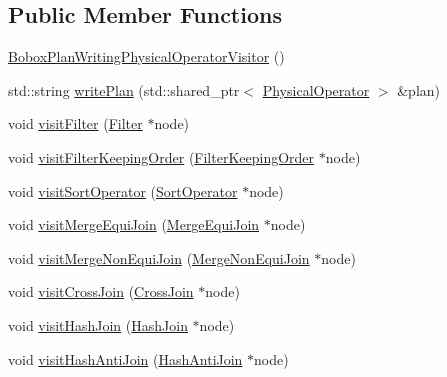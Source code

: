 \subsection*{Public Member Functions}
\begin{DoxyCompactItemize}
\item 
\hyperlink{class_bobox_plan_writing_physical_operator_visitor_a77c03666c41cd9a0db08dc5681fd1512}{Bobox\+Plan\+Writing\+Physical\+Operator\+Visitor} ()
\item 
std\+::string \hyperlink{class_bobox_plan_writing_physical_operator_visitor_ad19fe61538f80b821617614a31e30cb2}{write\+Plan} (std\+::shared\+\_\+ptr$<$ \hyperlink{class_physical_operator}{Physical\+Operator} $>$ \&plan)
\item 
void \hyperlink{class_bobox_plan_writing_physical_operator_visitor_a443e89add4155e51b2d7d1973afb3af5}{visit\+Filter} (\hyperlink{class_filter}{Filter} $\ast$node)
\item 
void \hyperlink{class_bobox_plan_writing_physical_operator_visitor_a041f79a1705915af0d45e623ad7a18ac}{visit\+Filter\+Keeping\+Order} (\hyperlink{class_filter_keeping_order}{Filter\+Keeping\+Order} $\ast$node)
\item 
void \hyperlink{class_bobox_plan_writing_physical_operator_visitor_ac482fb6eae4e0bcb957bad6c572a2c03}{visit\+Sort\+Operator} (\hyperlink{class_sort_operator}{Sort\+Operator} $\ast$node)
\item 
void \hyperlink{class_bobox_plan_writing_physical_operator_visitor_ac66108bf441456b57aded81ac17b111b}{visit\+Merge\+Equi\+Join} (\hyperlink{class_merge_equi_join}{Merge\+Equi\+Join} $\ast$node)
\item 
void \hyperlink{class_bobox_plan_writing_physical_operator_visitor_a75a1a20aecd434d712dff1867bf5ec37}{visit\+Merge\+Non\+Equi\+Join} (\hyperlink{class_merge_non_equi_join}{Merge\+Non\+Equi\+Join} $\ast$node)
\item 
void \hyperlink{class_bobox_plan_writing_physical_operator_visitor_a882ad63c59098b1bca68fca5d36b8871}{visit\+Cross\+Join} (\hyperlink{class_cross_join}{Cross\+Join} $\ast$node)
\item 
void \hyperlink{class_bobox_plan_writing_physical_operator_visitor_a5616d43abbe0666c854342af2d3aec94}{visit\+Hash\+Join} (\hyperlink{class_hash_join}{Hash\+Join} $\ast$node)
\item 
void \hyperlink{class_bobox_plan_writing_physical_operator_visitor_a01ed46af47fc5c7fb7af2b6b5b2483ba}{visit\+Hash\+Anti\+Join} (\hyperlink{class_hash_anti_join}{Hash\+Anti\+Join} $\ast$node)

\end{DoxyCompactItemize}
